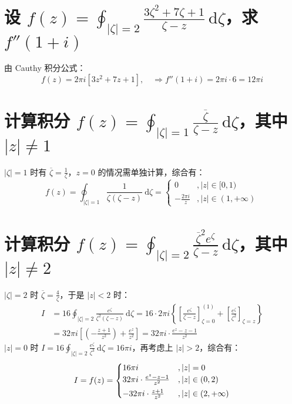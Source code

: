 \documentclass[UTF8]{report}
\theoremstyle{MyLineTheoremStyle} %
\theoremstyle{MyBlockTheoremStyle} %
\theoremstyle{MySubsubsectionStyle} %
\begin{document}
\section{设 $\displaystyle f(z) = \oint_{| \zeta  |= 2} \frac{3 \zeta^2 + 7 \zeta + 1}{\zeta - z} \ \mathrm{d}\zeta $，求 $f''(1+i)$}

由 Cauthy 积分公式：
\begin{equation}
f(z) = 2 \pi i \left[ 3z^2 + 7z + 1 \right],\quad \Longrightarrow  f''(1+i) = 2 \pi i \cdot 6 = 12 \pi i
\end{equation}

\section{计算积分 $\displaystyle f(z) = \oint_{| \zeta | = 1} \frac{\overline{\zeta}}{\zeta - z} \ \mathrm{d}\zeta$，其中 $| z | \ne 1$}

$| \zeta | = 1$ 时有 $\overline{\zeta} = \frac{1}{\zeta}$，$z = 0$ 的情况需单独计算，综合有：
\begin{equation}
f(z) = \oint_{| \zeta | = 1} \frac{1}{\zeta(\zeta - z)} \ \mathrm{d}\zeta =
\begin{cases}
    0 &, | z | \in [0, 1) \\ 
    -\frac{2\pi i}{z} &, | z | \in (1, +\infty)
\end{cases}
\end{equation}


\section{计算积分 $\displaystyle f(z) = \oint_{| \zeta | = 2} \frac{\overline{\zeta}^2 e^\zeta}{\zeta - z} \ \mathrm{d}\zeta $，其中 $| z | \ne 2$}

$| \zeta |  = 2$ 时 $\overline{\zeta} = \frac{4}{\zeta}$，于是 $| z | < 2$ 时：
\begin{align}
I 
&= 16 \oint_{| \zeta | = 2} \frac{e^\zeta}{\zeta^2(\zeta - z)} \ \mathrm{d}\zeta 
= 16 \cdot 2 \pi i \left\{ \left[\frac{e^\zeta}{\zeta - z}\right]^{(1)}_{\zeta = 0} + \left[\frac{e^\zeta}{\zeta^2}\right]_{\zeta = z}\right\} \\
&= 32 \pi i \left[ \left(-\frac{z+1}{z^2}\right) + \frac{e^z}{z^2}  \right] = 32 \pi i \cdot \frac{e^z - z - 1}{z^2} 
\end{align}
$| z | = 0$ 时 $I = 16 \oint_{| \zeta | = 2} \frac{e^\zeta}{\zeta^3} \ \mathrm{d}\zeta = 16 \pi i$，再考虑上 $| z | > 2$，综合有：
\begin{equation}
I = f(z) =
\begin{cases}
    16 \pi i &,  | z | = 0 \\ 
    32 \pi i \cdot \frac{e^z - z - 1}{z^2} &, | z | \in (0, 2) \vspace*{1mm} \\ 
    -32 \pi i \cdot \frac{z+1}{z^2} &, | z | \in (2, +\infty)
\end{cases}
\end{equation}
\end{document}
